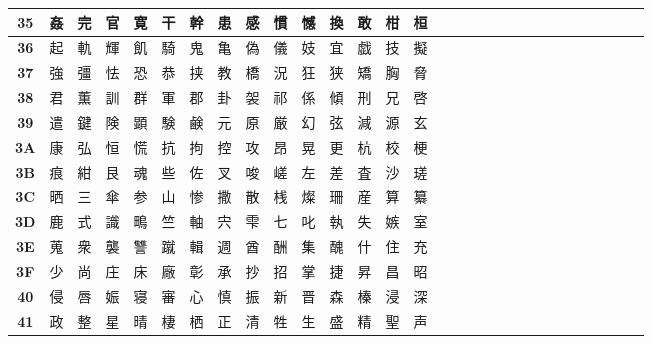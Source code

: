 \begin{table}[H]
\begin{tabular}{|Sc|Sc|Sc|Sc|Sc|Sc|Sc|Sc|Sc|Sc|Sc|Sc|Sc|Sc|Sc|}
\textbf{35} & 姦 & 完 & 官 & 寛 & 干 & 幹 & 患 & 感 & 慣 & 憾 & 換 & 敢 & 柑 & 桓 \\ \hline
\textbf{36} & 起 & 軌 & 輝 & 飢 & 騎 & 鬼 & 亀 & 偽 & 儀 & 妓 & 宜 & 戯 & 技 & 擬 \\ \hline
\textbf{37} & 強 & 彊 & 怯 & 恐 & 恭 & 挟 & 教 & 橋 & 況 & 狂 & 狭 & 矯 & 胸 & 脅 \\ \hline
\textbf{38} & 君 & 薫 & 訓 & 群 & 軍 & 郡 & 卦 & 袈 & 祁 & 係 & 傾 & 刑 & 兄 & 啓 \\ \hline
\textbf{39} & 遣 & 鍵 & 険 & 顕 & 験 & 鹸 & 元 & 原 & 厳 & 幻 & 弦 & 減 & 源 & 玄 \\ \hline
\textbf{3A} & 康 & 弘 & 恒 & 慌 & 抗 & 拘 & 控 & 攻 & 昂 & 晃 & 更 & 杭 & 校 & 梗 \\ \hline
\textbf{3B} & 痕 & 紺 & 艮 & 魂 & 些 & 佐 & 叉 & 唆 & 嵯 & 左 & 差 & 査 & 沙 & 瑳 \\ \hline
\textbf{3C} & 晒 & 三 & 傘 & 参 & 山 & 惨 & 撒 & 散 & 桟 & 燦 & 珊 & 産 & 算 & 纂 \\ \hline
\textbf{3D} & 鹿 & 式 & 識 & 鴫 & 竺 & 軸 & 宍 & 雫 & 七 & 叱 & 執 & 失 & 嫉 & 室 \\ \hline
\textbf{3E} & 蒐 & 衆 & 襲 & 讐 & 蹴 & 輯 & 週 & 酋 & 酬 & 集 & 醜 & 什 & 住 & 充 \\ \hline
\textbf{3F} & 少 & 尚 & 庄 & 床 & 廠 & 彰 & 承 & 抄 & 招 & 掌 & 捷 & 昇 & 昌 & 昭 \\ \hline
\textbf{40} & 侵 & 唇 & 娠 & 寝 & 審 & 心 & 慎 & 振 & 新 & 晋 & 森 & 榛 & 浸 & 深 \\ \hline
\textbf{41} & 政 & 整 & 星 & 晴 & 棲 & 栖 & 正 & 清 & 牲 & 生 & 盛 & 精 & 聖 & 声 \\ \hline
\end{tabular}
\end{table}


